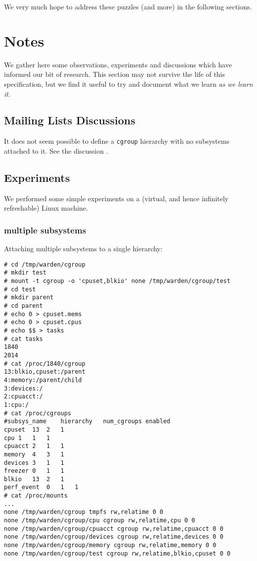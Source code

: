 \documentclass[a4paper,twoside,12pt]{article}
\begin{document}
We very much hope to address these puzzles (and more) in the following sections.

\section{Notes}

We gather here some observations, experiments and discussions which have informed our bit of research. This section may not survive the life of this specification, but we find it useful to try and document what we learn \emph{as we learn it}.

\subsection{Mailing Lists Discussions}

It does not seem possible to define a \texttt{cgroup} hierarchy with no subsystems attached to it.
See the discussion \cite{noop}.

\subsection{Experiments}
We performed some simple experiments on a (virtual, and hence infinitely refreshable) Linux machine.

\subsubsection*{multiple subsystems}

Attaching multiple subsystems to a single hierarchy:
{\small \begin{verbatim}
# cd /tmp/warden/cgroup
# mkdir test
# mount -t cgroup -o 'cpuset,blkio' none /tmp/warden/cgroup/test
# cd test
# mkdir parent
# cd parent
# echo 0 > cpuset.mems 
# echo 0 > cpuset.cpus
# echo $$ > tasks
# cat tasks
1840
2014
# cat /proc/1840/cgroup
13:blkio,cpuset:/parent
4:memory:/parent/child
3:devices:/
2:cpuacct:/
1:cpu:/
# cat /proc/cgroups
#subsys_name	hierarchy	num_cgroups	enabled
cpuset	13	2	1
cpu	1	1	1
cpuacct	2	1	1
memory	4	3	1
devices	3	1	1
freezer	0	1	1
blkio	13	2	1
perf_event	0	1	1
# cat /proc/mounts 
...
none /tmp/warden/cgroup tmpfs rw,relatime 0 0
none /tmp/warden/cgroup/cpu cgroup rw,relatime,cpu 0 0
none /tmp/warden/cgroup/cpuacct cgroup rw,relatime,cpuacct 0 0
none /tmp/warden/cgroup/devices cgroup rw,relatime,devices 0 0
none /tmp/warden/cgroup/memory cgroup rw,relatime,memory 0 0
none /tmp/warden/cgroup/test cgroup rw,relatime,blkio,cpuset 0 0
\end{verbatim}}
\end{document}
